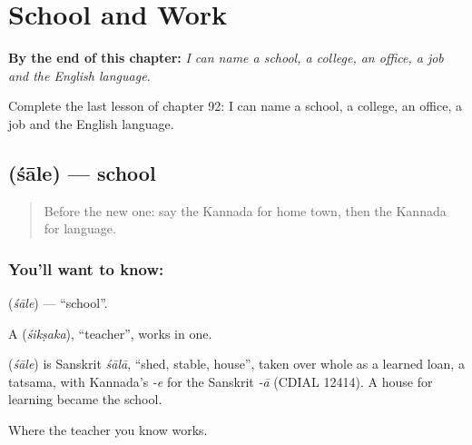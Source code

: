 
\chapter{School and Work}
\label{ch:ka-school-and-work}

\begin{chapteropening}
\textbf{By the end of this chapter:} \emph{I can name a school, a college, an office, a job and the English language.}

Complete the last lesson of chapter 92: I can name a school, a college, an office, a job and the English language.
\end{chapteropening}

\section[\texorpdfstring{\kn{ಶಾಲೆ} (śāle)}{ಶಾಲೆ (śāle)}]{ (śāle) — school}

\label{lesson:KA-C92-school}



\begin{quote}
Before the new one: say the Kannada for home town, then the Kannada for language.
\end{quote}

\subsection*{You'll want to know: }
\textbf{} (\emph{śāle}) — \textquotedblleft{}school\textquotedblright{}.

A \textbf{} (\emph{śikṣaka}), \textquotedblleft{}teacher\textquotedblright{}, works in one.

\begin{cousinweb}
\textbf{} (\emph{śāle}) is Sanskrit \emph{śālā}, \textquotedblleft{}shed, stable, house\textquotedblright{}, taken over whole as a learned loan, a tatsama, with Kannada's \emph{-e} for the Sanskrit \emph{-ā} (CDIAL 12414). A house for learning became the school.
\end{cousinweb}

\begin{grammarlens}[title={What you've built}]
Where the teacher you know works.
\end{grammarlens}

